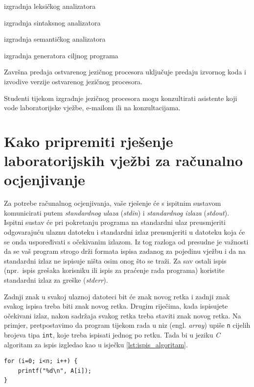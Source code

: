 \documentclass[times, 12pt, utf8]{book}
\begin{document}
\begin{description}
\itemsep 1pt
\item[I laboratorijska cjelina:] izgradnja leksičkog analizatora
\item[II laboratorijska cjelina:] izgradnja sintaksnog analizatora
\item[III laboratorijska cjelina:] izgradnja semantičkog analizatora
\item[IV laboratorijska cjelina:] izgradnja generatora ciljnog programa
\end{description}

Završna predaja ostvarenog jezičnog procesora uključuje predaju izvornog koda i izvodive verzije ostvarenog jezičnog procesora.

Studenti tijekom izgradnje jezičnog procesora mogu konzultirati asistente koji vode laboratorijske vježbe, e-mailom ili na konzultacijama.

\section{Kako pripremiti rješenje laboratorijskih vježbi za računalno ocjenjivanje}
Za potrebe računalnog ocjenjivanja, vaše rješenje će s ispitnim sustavom komunicirati putem \emph{standardnog ulaza} (\emph{stdin}) i \emph{standardnog izlaza} (\emph{stdout}).
Ispitni sustav će pri pokretanju programa na standardni ulaz preusmjeriti odgovarajuću ulaznu datoteku i standardni izlaz preusmjeriti u datoteku koja će se onda uspoređivati s očekivanim izlazom.
Iz tog razloga od presudne je važnosti da se vaš program strogo drži formata ispisa zadanog za pojedinu vježbu i da na standardni izlaz ne ispisuje ništa osim onog što se traži.
Za sav ostali ispis (npr.~ispis grešaka korisniku ili ispis za praćenje rada programa) koristite standardni izlaz za greške (\emph{stderr}).

Zadnji znak u svakoj ulaznoj datoteci bit će znak novog retka i zadnji znak svakog ispisa treba biti znak novog retka.
Drugim riječima, kada ispisujete očekivani izlaz, nakon sadržaja svakog retka treba staviti znak novog retka.
Na primjer, pretpostavimo da program tijekom rada u niz (engl. \emph{array}) upiše \texttt{n} cijelih brojeva tipa \texttt{int}, koje treba ispisati jednog po retku.
Tada bi u jeziku \emph{C} algoritam za ispis izgledao kao u isječku \ref{lst:ispis_algoritam}.

\begin{lstlisting}[caption={Primjer algoritma za ispis.},label=lst:ispis_algoritam]
for (i=0; i<n; i++) {
    printf("%d\n", A[i]);
}
\end{lstlisting}
\end{document}
